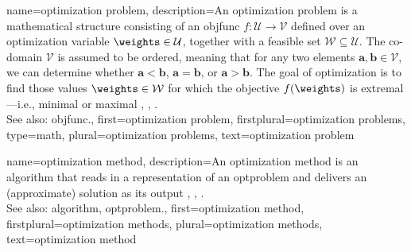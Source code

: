 {name={optimization problem}, 
	description={An optimization problem is a mathematical 
		   structure consisting of an \gls{objfunc} $f: \mathcal{U} \rightarrow \mathcal{V}$ 
		   defined over an optimization variable $\weights \in \mathcal{U}$, together with a 
		   feasible set $\mathcal{W} \subseteq \mathcal{U}$. The co-domain $\mathcal{V}$ is 
		   assumed to be ordered, meaning that for any two elements $\mathbf{a}, \mathbf{b} \in \mathcal{V}$, 
		   we can determine whether $\mathbf{a} < \mathbf{b}$, $\mathbf{a} = \mathbf{b}$, 
		   or $\mathbf{a} > \mathbf{b}$. The goal of optimization is to find those values $\weights \in \mathcal{W}$ 
		   for which the objective $f(\weights)$ is extremal—i.e., minimal or maximal \cite{BoydConvexBook}, \cite{BertsekasNonLinProgr}, \cite{nesterov04}.
		   \\
		   See also: \gls{objfunc}.},
	first={optimization problem},
	firstplural={optimization problems}, 
	type=math,
	plural={optimization problems}, 
	text={optimization problem}
}

{name={optimization method},
	description={An optimization method is an \gls{algorithm} that 
		reads in a representation of an \gls{optproblem} and delivers an (approximate) solution 
		as its output \cite{BoydConvexBook}, \cite{BertsekasNonLinProgr}, \cite{nesterov04}.
		 \\
		 See also: \gls{algorithm}, \gls{optproblem}.},
	first={optimization method},
	firstplural={optimization methods}, 
	plural={optimization methods}, 
	text={optimization method}
}

